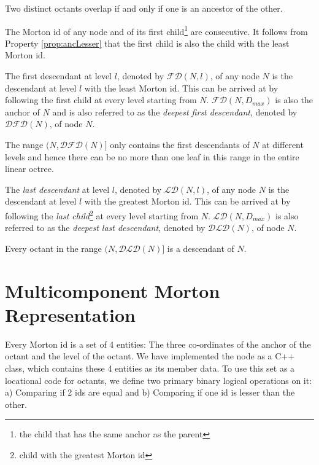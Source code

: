 \begin{prop}
Two distinct octants overlap if and only if one is an ancestor of the
other.
\label{prop:overlap}
\end{prop}

\begin{prop}
The Morton id of any node and of its first child\footnote{the child
that has the same anchor as the parent} are consecutive. It follows
from Property \ref{prop:ancLesser} that the first child is also the
child with the least Morton id.
  \label{prop:fcProp}
\end{prop}

\begin{prop}
The first descendant at level $l$, denoted by
$\mathcal{FD}\left(N,l\right)$, of any node $N$ is the descendant at
level $l$ with the least Morton id. This can be arrived at by
following the first child at every level starting from
$N$. $\mathcal{FD}\left(N,D_{max}\right)$ is also the anchor of $N$
and is also referred to as the {\em deepest first descendant}, denoted
by $\mathcal{DFD}(N)$, of node $N$.
  \label{prop:fdProp}
\end{prop}

\begin{prop}
The range $(N,\mathcal{DFD}(N)]$ only contains the first descendants
of $N$ at different levels and hence there can be no more than one
leaf in this range in the entire linear octree.
  \label{prop:rangeFprop}
\end{prop}

\begin{prop}
The {\em last descendant} at level $l$, denoted by
$\mathcal{LD}\left(N,l\right)$, of any node $N$ is the descendant at
level $l$ with the greatest Morton id. This can be arrived at by
following the {\em last child}\footnote{child with the greatest Morton
id} at every level starting from
$N$. $\mathcal{LD}\left(N,D_{max}\right)$ is also referred to as the
{\em deepest last descendant}, denoted by $\mathcal{DLD}(N)$, of node
$N$.
  \label{prop:ldProp}
\end{prop}

\begin{prop}
Every octant in the range $(N,\mathcal{DLD}(N)]$ is a descendant of
$N$.
  \label{prop:rangeLprop}
\end{prop}

\section{Multicomponent Morton Representation}
\label{app:mortonClass}
Every Morton id is a set of 4 entities: The three co-ordinates of the
anchor of the octant and the level of the octant. We have implemented
the node as a C++ class, which contains these 4 entities as its member
data. To use this set as a locational code for octants, we define two
primary binary logical operations on it: a) Comparing if 2 ids are
equal and b) Comparing if one id is lesser than the other.

